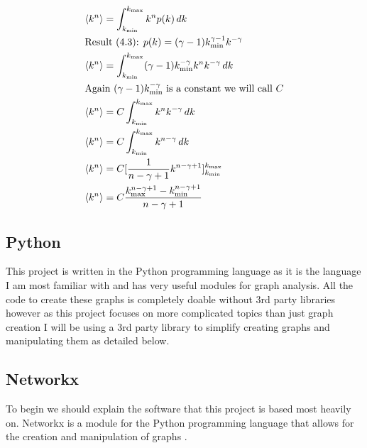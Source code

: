 \documentclass{article}
\begin{document}
            \begin{align*}
                &\langle k^n \rangle = \int_{k_{\text{min}}}^{k_{\text{max}}}k^{n}p(k) \,dk\\
                &\text{Result (4.3): } p(k) = (\gamma -1)k^{\gamma-1}_{\text{min}}k^{-\gamma}\\
                &\langle k^n \rangle = \int_{k_{\text{min}}}^{k_{\text{max}}} (\gamma-1)k^{-\gamma}_{\text{min}}k^{n}k^{-\gamma} \,dk \\
                &\text{Again $ (\gamma-1)k^{-\gamma}_{\text{min}}$ is a constant we will call $C$}\\
                &\langle k^n \rangle = C\int_{k_{\text{min}}}^{k_{\text{max}}}k^{n}k^{-\gamma} \,dk\\ 
                &\langle k^n \rangle = C\int_{k_{\text{min}}}^{k_{\text{max}}}k^{n-\gamma} \,dk\\
                &\langle k^n \rangle = C[\frac{1}{n-\gamma +1}k^{n-\gamma+1}]^{k_{\text{max}}}_{k_{\text{min}}}\\
                &\langle k^n \rangle = C\frac{k_{\text{max}}^{n-\gamma+1} -k_{\text{min}}^{n-\gamma+1}}{n-\gamma +1 }
            \end{align*}

        \subsection{Python}
        This project is written in the Python programming language as it is the language I am most familiar with and has very useful modules for graph analysis. All the code to create these graphs is completely doable without 3rd party libraries however as this project focuses on more complicated topics than just graph creation I will be using a 3rd party library to simplify creating graphs and manipulating them as detailed below.
        \subsection{Networkx}
        To begin we should explain the software that this project is based most heavily on. Networkx is a module for the Python programming language that allows for the creation and manipulation of graphs \parencite{SciPyProceedings_11}.
\end{document}
